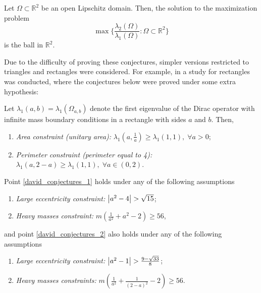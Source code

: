 \begin{conjecture}\label{conjecture_benguria}
    Let \(\Omega \subset \mathbb{R}^2\) be an open Lipschitz domain. Then, the solution to the maximization problem
    \[
    \max \Big\{\frac{\lambda_2(\Omega)}{\lambda_1(\Omega)}: \Omega \subset \mathbb{R}^2\Big\}
    \]
    is the ball in \(\mathbb{R}^2\).
\end{conjecture}


Due to the difficulty of proving these conjectures, simpler versions restricted to triangles and rectangles were considered. For example, in \cite{briet2022spectral} a study for rectangles was conducted, where the conjectures below were proved under some extra hypothesis:

\begin{conjecture}\label{david_conjectures}
    Let \(\lambda_1(a, b) = \lambda_1(\Omega_{a, b})\) denote the first eigenvalue of the Dirac operator with infinite mass boundary conditions in a rectangle with sides \(a\) and \(b\). Then,
    \begin{enumerate}
        \item \label{david_conjectures_1} \textit{Area constraint (unitary area): } \(\lambda_1(a, \frac{1}{a}) \geq \lambda_1(1, 1), \; \forall a>0 \);
        \item  \label{david_conjectures_2} \textit{Perimeter constraint (perimeter equal to 4): } \(\lambda_1(a, 2-a) \geq \lambda_1(1, 1), \; \forall a\in (0, 2)\).
    \end{enumerate}
    Point \ref{david_conjectures_1} holds under any of the following assumptions
    \begin{enumerate}
        \item \textit{Large eccentricity constraint: } \(\abs{a^2-4} > \sqrt{15}\);
        \item \textit{Heavy masses constraint: } \(m \left(\frac{1}{a^2}+a^2-2\right) \geq 56\),
    \end{enumerate}
    and point \ref{david_conjectures_2} also holds under any of the following assumptions
    \begin{enumerate}
        \item \textit{Large eccentricity constraint: } \(\abs{a^2-1} > \frac{9-\sqrt{33}}{8}\);
        \item \textit{Heavy masses constraints: } \(m \left(\frac{1}{a^2}+\frac{1}{(2-a)^2}-2\right) \geq 56\).
    \end{enumerate}
\end{conjecture}

